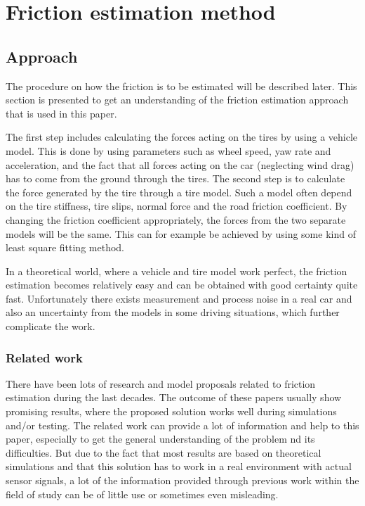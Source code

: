 \chapter{Friction estimation method}

\section{Approach}

The procedure on how the friction is to be estimated will be described later. This section is presented to get an understanding of the friction estimation approach that is used in this paper.

The first step includes calculating the forces acting on the tires by using a vehicle model. This is done by using parameters such as wheel speed, yaw rate and acceleration, and the fact that all forces acting on the car (neglecting wind drag) has to come from the ground through the tires. The second step is to calculate the force generated by the tire through a tire model. Such a model often depend on the tire stiffness, tire slips, normal force and the road friction coefficient. By changing the friction coefficient appropriately, the forces from the two separate models will be the same. This can for example be achieved by using some kind of least square fitting method. 

In a theoretical world, where a vehicle and tire model work perfect, the friction estimation becomes relatively easy and can be obtained with good certainty quite fast. Unfortunately there exists measurement and process noise in a real car and also an uncertainty from the models in some driving situations, which further complicate the work.


\subsection{Related work}

There have been lots of research and model proposals related to friction estimation during the last decades. The outcome of these papers usually show promising results, where the proposed solution works well during simulations and/or testing. The related work can provide a lot of information and help to this paper, especially to get the general understanding of the problem nd its difficulties. But due to the fact that most results are based on theoretical simulations and that this solution has to work in a real environment with actual sensor signals, a lot of the information provided through previous work within the field of study can be of little use or sometimes even misleading.


